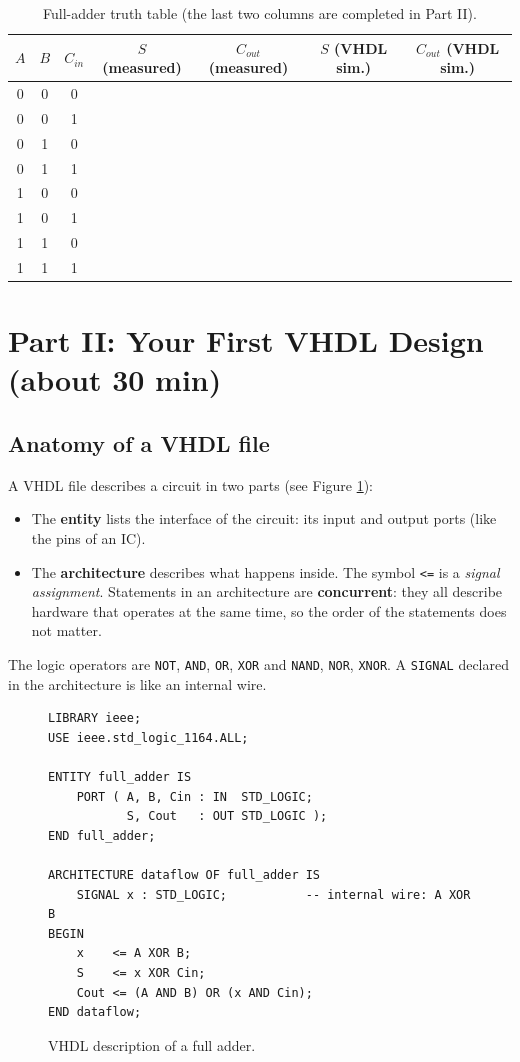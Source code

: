 \documentclass{article}
\begin{document}
\begin{table}[H]
    \centering
    \begin{tabular}{|c|c|c|c|c|c|c|}
        \hline
        $A$ & $B$ & $C_{in}$ & $S$ (measured) & $C_{out}$ (measured) & $S$ (VHDL sim.) & $C_{out}$ (VHDL sim.) \\
        \hline
        0 & 0 & 0 & & & & \\
        0 & 0 & 1 & & & & \\
        0 & 1 & 0 & & & & \\
        0 & 1 & 1 & & & & \\
        1 & 0 & 0 & & & & \\
        1 & 0 & 1 & & & & \\
        1 & 1 & 0 & & & & \\
        1 & 1 & 1 & & & & \\
        \hline
    \end{tabular}
    \caption{Full-adder truth table (the last two columns are completed in Part II).}
    \label{tab:fa_table}
\end{table}

\section*{Part II: Your First VHDL Design (about 30 min)}

\subsection*{Anatomy of a VHDL file}
A VHDL file describes a circuit in two parts (see Figure \ref{fig:fa_vhdl}):
\begin{itemize}
    \item The \textbf{entity} lists the interface of the circuit: its input and output ports (like the pins of an IC).
    \item The \textbf{architecture} describes what happens inside. The symbol \texttt{<=} is a \emph{signal assignment}. Statements in an architecture are \textbf{concurrent}: they all describe hardware that operates at the same time, so the order of the statements does not matter.
\end{itemize}
The logic operators are \texttt{NOT}, \texttt{AND}, \texttt{OR}, \texttt{XOR} and \texttt{NAND}, \texttt{NOR}, \texttt{XNOR}. A \texttt{SIGNAL} declared in the architecture is like an internal wire.

\begin{figure}[H]
    \centering
    \begin{verbatim}
LIBRARY ieee;
USE ieee.std_logic_1164.ALL;

ENTITY full_adder IS
    PORT ( A, B, Cin : IN  STD_LOGIC;
           S, Cout   : OUT STD_LOGIC );
END full_adder;

ARCHITECTURE dataflow OF full_adder IS
    SIGNAL x : STD_LOGIC;           -- internal wire: A XOR B
BEGIN
    x    <= A XOR B;
    S    <= x XOR Cin;
    Cout <= (A AND B) OR (x AND Cin);
END dataflow;
    \end{verbatim}
    \caption{VHDL description of a full adder.}
    \label{fig:fa_vhdl}
\end{figure}
\end{document}
